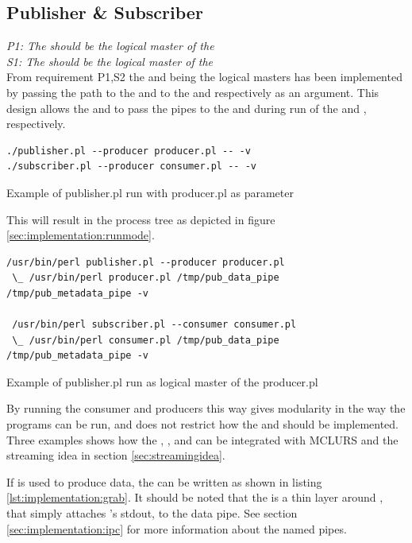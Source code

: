 \subsection{Publisher \& Subscriber}

\textit{P1: The \pub{} should be the logical master of the \pro{}}\\
\textit{S1: The \sub{} should be the logical master of the \pro{}}\\

From requirement P1,S2 the \pub{} and \sub{} being the logical masters has been implemented by passing the path to the \con{} and \pro{} to the \sub{} and \pro{} respectively as an argument. This design allows the \pub{} and \sub{} to pass the pipes to the \pro{} and \con{} during run of the \con{} and \pro{}, respectively.

\begin{listing}[H] 
\begin{verbatim}
./publisher.pl --producer producer.pl -- -v
./subscriber.pl --producer consumer.pl -- -v
\end{verbatim}
\caption{Example of publisher.pl run with producer.pl as parameter}
\label{code:critical_section_c}
\end{listing}

This will result in the process tree as depicted in figure \ref{sec:implementation:runmode}.

\begin{listing}[H] 
\begin{verbatim}
/usr/bin/perl publisher.pl --producer producer.pl
 \_ /usr/bin/perl producer.pl /tmp/pub_data_pipe /tmp/pub_metadata_pipe -v
 
 /usr/bin/perl subscriber.pl --consumer consumer.pl
 \_ /usr/bin/perl consumer.pl /tmp/pub_data_pipe /tmp/pub_metadata_pipe -v
\end{verbatim}
\caption{Example of publisher.pl run as logical master of the producer.pl}
\label{sec:implementation:runmode}
\end{listing}

By running the consumer and producers this way gives modularity in the way the programs can be run, and does not restrict how the \con{} and \pro{} should be implemented.
Three examples shows how the \pros{}, \cons{}, \pros{} and \subs{} can be integrated with MCLURS and the streaming idea in section \ref{sec:streamingidea}.

If  is used to produce data, the \con{} can be written as shown in listing \ref{lst:implementation:grab}. It should be noted that the \pro{} is a thin layer around , that simply attaches 's stdout, to the data pipe. See section \ref{sec:implementation:ipc} for more information about the named pipes.

